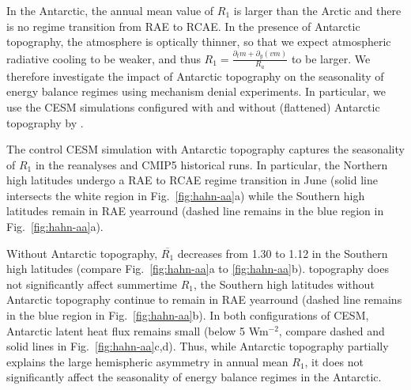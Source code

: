 \documentclass{ametsocV5}
\begin{document}
  In the Antarctic, the annual mean value of $R_1$ is larger than the Arctic and there is no regime transition from RAE to RCAE. In the presence of Antarctic topography, the atmosphere is optically thinner, so that we expect atmospheric radiative cooling to be weaker, and thus $R_1=\frac{\partial_t m + \partial_y (vm)}{R_a}$ to be larger. We therefore investigate the impact of Antarctic topography on the seasonality of energy balance regimes using mechanism denial experiments. In particular, we use the CESM simulations configured with and without (flattened) Antarctic topography by \cite{hahn2020}.

  The control CESM simulation with Antarctic topography captures the seasonality of $R_1$ in the reanalyses and CMIP5 historical runs. In particular, the Northern high latitudes undergo a RAE to RCAE regime transition in June (solid line intersects the white region in Fig.~\ref{fig:hahn-aa}a) while the Southern high latitudes remain in RAE yearround (dashed line remains in the blue region in Fig.~\ref{fig:hahn-aa}a).

  Without Antarctic topography, $\overline{R_1}$ decreases from 1.30 to 1.12 in the Southern high latitudes (compare Fig.~\ref{fig:hahn-aa}a to \ref{fig:hahn-aa}b).  topography does not significantly affect summertime $R_1$, the Southern high latitudes without Antarctic topography continue to remain in RAE yearround (dashed line remains in the blue region in Fig.~\ref{fig:hahn-aa}b). In both configurations of CESM, Antarctic latent heat flux remains small (below 5 Wm$^{-2}$, compare dashed and solid lines in Fig.~\ref{fig:hahn-aa}c,d). Thus, while Antarctic topography partially explains the large hemispheric asymmetry in annual mean $R_1$, it does not significantly affect the seasonality of energy balance regimes in the Antarctic.
\end{document}
